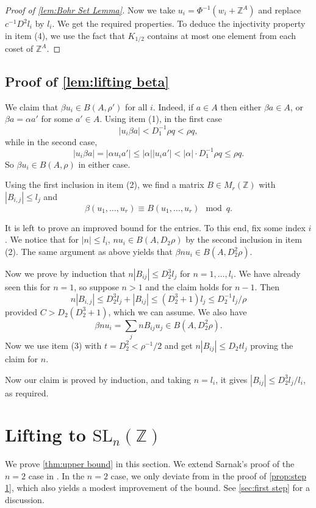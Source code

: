 \documentclass[12pt, a4paper]{amsart}
\numberwithin{equation}{section}
\theoremstyle{definition}
\newcommand{\Z}{\mathbb{Z}}
\newcommand{\SL}{\mathrm{SL}}
\begin{document}
\begin{proof}[Proof of \cref{lem:Bohr Set Lemma}]
Now we take $u_{i}=\Phi^{-1}(w_{i}+\Z^A)$ and replace $c^{-1}D^2l_i$ by $l_i$.
We get the required properties.
To deduce the injectivity property in item (4), we use the fact that $K_{1/2}$
contains at most one element from each coset of $\Z^A$.
\end{proof}

\subsection{Proof of \texorpdfstring{\cref{lem:lifting beta}}{Lemma 3.4}}\label{sec:lifting beta}
We claim that $\beta u_{i}\in B(A,\rho')$ for all $i$.
Indeed, if $a\in A$ then either $\beta a\in A$, or $\beta a=\alpha a'$ for some $a'\in A$. 
Using item (1), in the first case
\[
\left|u_{i}\beta a\right|<D_1^{-1}\rho q<\rho q,
\]
while in the second case,
\[
|u_{i}\beta a|=|\alpha u_{i} a'|\le|\alpha| |u_{i}a'|<|\alpha|\cdot D_1^{-1}\rho q\le \rho q.
\]
So $\beta u_{i}\in B(A,\rho)$ in either case. 

Using the first inclusion in item (2), we find a matrix $B\in M_r(\Z)$ with
$|B_{i,j}|\le l_j$ and
\[
\beta (u_1,\ldots, u_r)\equiv B(u_1,\ldots, u_r) \mod q.
\]

It is left to prove an improved bound for the entries.
To this end, fix some index $i$.
We notice that for $|n|\le l_{i}$, $n u_{i}\in B(A,D_2\rho)$
by the second inclusion in item (2).
The same argument as above yields that $\beta n u_{i} \in B(A, D_2^2\rho)$.


Now we prove by induction that $n |B_{ij}|\le D_2^3 l_j$ for $n=1,\ldots, l_i$.
We have already seen this for $n=1$, so suppose $n>1$ and the claim holds for $n-1$.
Then
\[
n |B_{i,j}|\le D_2^3 l_j+|B_{ij}|\le (D_2^3+1) l_j\le D_2^{-1}l_j/\rho
\]
provided $C> D_2(D_2^3+1)$, which we can assume.
We also have
\[
\beta n u_{i}=\sum_{j}n B_{ij}u_{j}\in B(A,D_2^2\rho).
\]
Now we use item (3) with $t=D_2^2<\rho^{-1}/2$
and get $n|B_{ij}|\le D_2tl_j$ proving the claim for $n$.

Now our claim is proved by induction, and taking $n=l_i$, it gives
$|B_{ij}|\le D_2^3 l_j/l_i$, as required. 





\section{Lifting to \texorpdfstring{$\SL_n(\Z)$}{SLn(Z)}}\label{sec:lifting sln}


We prove \cref{thm:upper bound} in this section.
We extend Sarnak's proof of the $n=2$ case in \cite{sarnak2015lettermiller}.
In the $n=2$ case, we only deviate from \cite{sarnak2015lettermiller}
in the proof of \cref{prop:step 1}, which also
yields a modest improvement of the bound.
See \cref{sec:first step} for a discussion.
\end{document}
